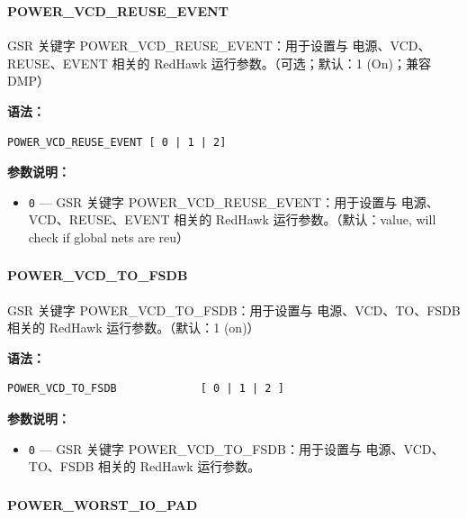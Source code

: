\subsubsection{}
\paragraph*{POWER_VCD_REUSE_EVENT}

GSR 关键字 POWER_VCD_REUSE_EVENT：用于设置与 电源、VCD、REUSE、EVENT 相关的 RedHawk 运行参数。（可选；默认：1 (On)；兼容 DMP）

\textbf{语法：}
\begin{lstlisting}
POWER_VCD_REUSE_EVENT [ 0 | 1 | 2]
\end{lstlisting}

\textbf{参数说明：}
\begin{itemize}
\item \texttt{0} — GSR 关键字 POWER\_VCD\_REUSE\_EVENT：用于设置与 电源、VCD、REUSE、EVENT 相关的 RedHawk 运行参数。（默认：value, will check if global nets are reu）
\end{itemize}

\subsubsection{}
\paragraph*{POWER_VCD_TO_FSDB}

GSR 关键字 POWER_VCD_TO_FSDB：用于设置与 电源、VCD、TO、FSDB 相关的 RedHawk 运行参数。（默认：1 (on)）

\textbf{语法：}
\begin{lstlisting}
POWER_VCD_TO_FSDB             [ 0 | 1 | 2 ]
\end{lstlisting}

\textbf{参数说明：}
\begin{itemize}
\item \texttt{0} — GSR 关键字 POWER\_VCD\_TO\_FSDB：用于设置与 电源、VCD、TO、FSDB 相关的 RedHawk 运行参数。
\end{itemize}

\subsubsection{}
\paragraph*{POWER_WORST_IO_PAD}

